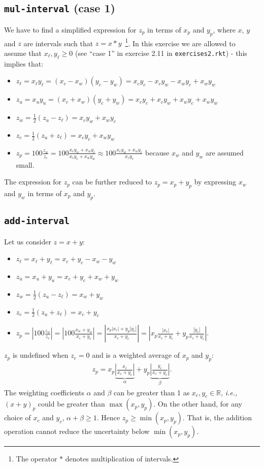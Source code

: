 \documentclass[12pt,a4paper]{article}
\newcommand\cc[1]{\texttt{#1}}
\newcommand{\abs}[1]{\left|#1\right|}
\begin{document}
\subsection{\cc{mul-interval} (case 1)}

We have to find a simplified expression for $z_p$ in terms of $x_p$ and $y_p$, where
$x$, $y$ and $z$ are intervals such that $z = x * y$~\footnote{The operator $*$ denotes
multiplication of intervals.}. In this exercise we are allowed to assume that $x_{\ell},
y_{\ell} \geq 0$ (see ``case 1'' in exercise 2.11 in \cc{exercises2.rkt}) - this implies
that:
\begin{itemize}
\item $z_{\ell} = x_{\ell} y_{\ell} = (x_c - x_w)(y_c - y_w) = x_cy_c - x_cy_w - x_wy_c + x_wy_w$
\item $z_{u} = x_{u} y_{u} = (x_c + x_w)(y_c + y_w) = x_cy_c + x_cy_w + x_wy_c + x_wy_w$
\item $z_w = \frac{1}{2}(z_u - z_{\ell}) = x_cy_w + x_wy_c$
\item $z_c = \frac{1}{2}(z_u + z_{\ell}) = x_cy_c + x_wy_w$
\item $z_p = 100\frac{z_w}{z_c} = 100\frac{x_cy_w + x_wy_c}{x_cy_c + x_wy_w} \approx 100\frac{x_cy_w + x_wy_c}{x_cy_c}$ because $x_w$ and $y_w$ are assumed small.
\end{itemize}
The expression for $z_p$ can be further reduced to $z_p = x_p + y_p$ by expressing $x_w$ and $y_w$ in terms of $x_p$ and $y_p$.

\subsection{\cc{add-interval}}

Let us consider $z = x + y$:
\begin{itemize}
\item $z_{\ell} = x_{\ell} + y_{\ell} = x_c + y_c - x_w - y_w$
\item $z_{u} = x_{u} + y_{u} = x_c + y_c + x_w + y_w$
\item $z_w = \frac{1}{2}(z_u - z_{\ell}) = x_w + y_w$
\item $z_c = \frac{1}{2}(z_u + z_{\ell}) = x_c + y_c$
\item $z_p = \abs{100\frac{z_w}{z_c}} = \abs{100\frac{x_w + y_w}{x_c + y_c}} = \abs{\frac{x_p\abs{x_c} + y_p\abs{y_c}}{x_c + y_c}} = \abs{x_p\frac{\abs{x_c}}{x_c + y_c} + y_p\frac{\abs{y_c}}{x_c + y_c}}$.
\end{itemize}
$z_p$ is undefined when $z_c = 0$ and is a weighted average of $x_p$ and $y_p$:
\begin{align*}
  z_p =
  x_p\underbrace{\abs{\frac{x_c}{x_c + y_c}}}_{\alpha} +
  y_p\underbrace{\abs{\frac{y_c}{x_c + y_c}}}_{\beta}.
\end{align*}
The weighting coefficients $\alpha$ and $\beta$ can be greater than 1 as $x_c,
y_c\in\mathbb{R}$, \emph{i.e.,} $(x+y)_p$ could be greater than $\max(x_p, y_p)$. On the
other hand, for any choice of $x_c$ and $y_c$, $\alpha + \beta \geq 1$. Hence $z_p \geq
\min(x_p, y_p)$. That is, the addition operation cannot reduce the uncertainty below
$\min(x_p, y_p)$.
\end{document}
